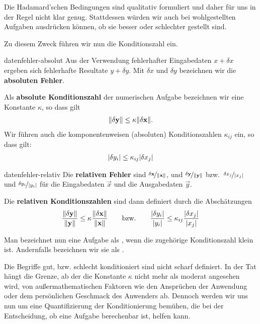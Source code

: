 \begin{remark}
  Die Hadamard'schen Bedingungen sind qualitativ formuliert und daher
  für uns in der Regel nicht klar genug. Stattdessen würden wir auch
  bei wohlgestellten Aufgaben ausdrücken können, ob sie
  \glqq{}besser\grqq{} oder \glqq{}schlechter\grqq{} gestellt sind.

  Zu diesem Zweck führen wir nun die Konditionszahl ein.
\end{remark}

\begin{Definition}{datenfehler-absolut}
  Aus der Verwendung fehlerhafter Eingabedaten $x+\delta x$ ergeben
  sich fehlerhafte Resultate $y+\delta y$. Mit $\delta x$ und
  $\delta y$ bezeichnen wir die \textbf{absoluten
    Fehler}.

  Als \textbf{absolute Konditionszahl} der numerischen Aufgabe bezeichnen wir eine Konstante $\kappa$, so dass gilt
  \begin{gather}
    \lVert\delta \mathbf{y}\rVert
    \le \kappa \lVert\delta \mathbf{x}\rVert.
  \end{gather}
  Wir führen auch die komponentenweisen (absoluten) Konditionszahlen
  $\kappa_{ij}$ ein, so dass gilt:
  \begin{gather}
    \lvert\delta y_i\rvert
    \le \kappa_{ij} \lvert\delta x_j\rvert
  \end{gather}
\end{Definition}

\begin{Definition}{datenfehler-relativ}
  Die \textbf{relativen Fehler} sind
  $\nicefrac{\delta \mathbf{x}}{\lVert\mathbf{x}\rVert}$, und
  $\nicefrac{\delta \mathbf{y}}{\lVert\mathbf{y}\rVert}$ bzw.\
  $\nicefrac{\delta x_j}{\lvert x_j\rvert}$ und
  $\nicefrac{\delta y_i}{\lvert y_i\rvert}$ für die Eingabedaten $\vec x$ und
  die Ausgabedaten $\vec y$.

  Die \textbf{relativen Konditionszahlen} sind dann definiert durch die Abschätzungen
  \begin{gather}
    \frac{\lVert\delta \mathbf{y}\rVert}{\lVert\mathbf{y}\rVert}
    \le \kappa \frac{\lVert\delta \mathbf{x}\rVert}{\lVert\mathbf{x}\rVert}
    \qquad\text{bzw.}\qquad
    \frac{\lvert\delta y_i\rvert}{\lvert y_i\rvert}
    \le \kappa_{ij} \frac{\lvert\delta x_j\rvert}{\lvert x_j\rvert}
  \end{gather}
\end{Definition}

\begin{remark}
  Man bezeichnet nun eine Aufgabe als , wenn
  die zugehörige Konditionszahl klein ist. Andernfalls bezeichnen wir
  sie als \define{schlecht konditioniert}.

  Die Begriffe \glqq gut\grqq, bzw. \glqq schlecht
  konditioniert\grqq{} sind nicht scharf definiert. In der Tat hängt
  die Grenze, ab der die Konstante $\kappa$ nicht mehr als \glqq
  moderat\grqq{} angesehen wird, von außermathematischen Faktoren wie
  den Ansprüchen der Anwendung oder dem persönlichen Geschmack des
  Anwenders ab. Dennoch werden wir uns nun um eine Quantifizierung der
  Konditionierung bemühen, die bei der Entscheidung, ob eine Aufgabe
  berechenbar ist, helfen kann.
\end{remark}


